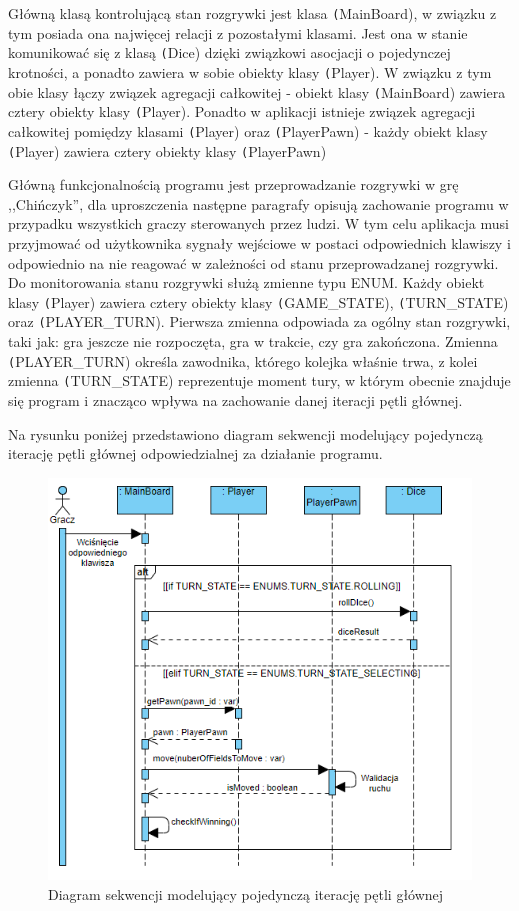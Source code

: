 \documentclass[conference]{IEEEtran}
\begin{document}
Główną klasą kontrolującą stan rozgrywki jest klasa \texttt(MainBoard), w związku z tym posiada ona najwięcej relacji z pozostałymi klasami. Jest ona w stanie komunikować się z klasą \texttt(Dice) dzięki związkowi asocjacji o pojedynczej krotności, a ponadto zawiera w sobie obiekty klasy \texttt(Player). W związku z tym obie klasy łączy związek agregacji całkowitej - obiekt klasy \texttt(MainBoard) zawiera cztery obiekty klasy \texttt(Player). Ponadto w aplikacji istnieje związek agregacji całkowitej pomiędzy klasami \texttt(Player) oraz \texttt(PlayerPawn) - każdy obiekt klasy \texttt(Player) zawiera cztery obiekty klasy \texttt(PlayerPawn)


Główną funkcjonalnością programu jest przeprowadzanie rozgrywki w grę ,,Chińczyk'', dla uproszczenia następne paragrafy opisują zachowanie programu w przypadku wszystkich graczy sterowanych przez ludzi. W tym celu aplikacja musi przyjmować od użytkownika sygnały wejściowe w postaci odpowiednich klawiszy i odpowiednio na nie reagować w zależności od stanu przeprowadzanej rozgrywki. Do monitorowania stanu rozgrywki służą zmienne typu ENUM. Każdy obiekt klasy \texttt(Player) zawiera cztery obiekty klasy \texttt(GAME\_STATE), \texttt(TURN\_STATE) oraz \texttt(PLAYER\_TURN). Pierwsza zmienna odpowiada za ogólny stan rozgrywki, taki jak: gra jeszcze nie rozpoczęta, gra w trakcie, czy gra zakończona. Zmienna \texttt(PLAYER\_TURN) określa zawodnika, którego kolejka właśnie trwa, z kolei zmienna \texttt(TURN\_STATE) reprezentuje moment tury, w którym obecnie znajduje się program i znacząco wpływa na zachowanie danej iteracji pętli głównej.

Na rysunku poniżej przedstawiono diagram sekwencji modelujący pojedynczą iterację pętli głównej odpowiedzialnej za działanie programu.

\begin{figure}[H]
    \centering
    \includegraphics[width=\linewidth]{Sequence.png}
    \caption{Diagram sekwencji modelujący pojedynczą iterację pętli głównej}
\end{figure}
\end{document}

